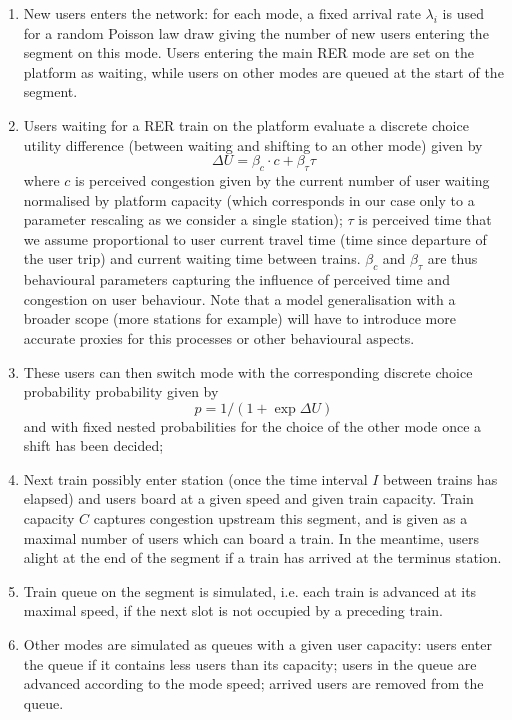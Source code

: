 \documentclass[3p,times,procedia]{elsarticle}
\begin{document}
\begin{enumerate}
	\item New users enters the network: for each mode, a fixed arrival rate $\lambda_i$ is used for a random Poisson law draw giving the number of new users entering the segment on this mode. Users entering the main RER mode are set on the platform as waiting, while users on other modes are queued at the start of the segment.
	\item Users waiting for a RER train on the platform evaluate a discrete choice utility difference (between waiting and shifting to an other mode) given by 
	\begin{equation} 
	\Delta U = \beta_c \cdot c + \beta_{\tau} \tau
	\end{equation}
	where $c$ is perceived congestion given by the current number of user waiting normalised by platform capacity (which corresponds in our case only to a parameter rescaling as we consider a single station); $\tau$ is perceived time that we assume proportional to user current travel time (time since departure of the user trip) and current waiting time between trains. $\beta_c$ and $\beta_{\tau}$ are thus behavioural parameters capturing the influence of perceived time and congestion on user behaviour. Note that a model generalisation with a broader scope (more stations for example) will have to introduce more accurate proxies for this processes or other behavioural aspects.
	\item These users can then switch mode with the corresponding discrete choice probability probability given by 
	\begin{equation}
	p = 1 / (1 + \exp \Delta U)
	\end{equation}
	and with fixed nested probabilities for the choice of the other mode once a shift has been decided;
	\item Next train possibly enter station (once the time interval $I$ between trains has elapsed) and users board at a given speed and given train capacity. Train capacity $C$ captures congestion upstream this segment, and is given as a maximal number of users which can board a train. In the meantime, users alight at the end of the segment if a train has arrived at the terminus station.
	\item Train queue on the segment is simulated, i.e. each train is advanced at its maximal speed, if the next slot is not occupied by a preceding train.
	\item Other modes are simulated as queues with a given user capacity: users enter the queue if it contains less users than its capacity; users in the queue are advanced according to the mode speed; arrived users are removed from the queue.
\end{enumerate}
\end{document}
